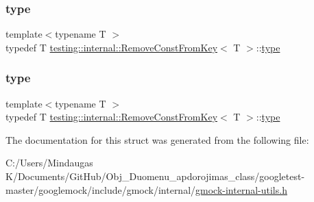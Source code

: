 \mbox{\label{structtesting_1_1internal_1_1_remove_const_from_key_ab657b0a0fe4ebc499d27011f73c794c1}} 
\subsubsection{\texorpdfstring{type}{type}\hspace{0.1cm}{\footnotesize\ttfamily [2/3]}}
{\footnotesize\ttfamily template$<$typename T $>$ \\
typedef T \mbox{\hyperlink{structtesting_1_1internal_1_1_remove_const_from_key}{testing\+::internal\+::\+Remove\+Const\+From\+Key}}$<$ T $>$\+::\mbox{\hyperlink{structtesting_1_1internal_1_1_remove_const_from_key_ab657b0a0fe4ebc499d27011f73c794c1}{type}}}

\mbox{\label{structtesting_1_1internal_1_1_remove_const_from_key_ab657b0a0fe4ebc499d27011f73c794c1}} 
\subsubsection{\texorpdfstring{type}{type}\hspace{0.1cm}{\footnotesize\ttfamily [3/3]}}
{\footnotesize\ttfamily template$<$typename T $>$ \\
typedef T \mbox{\hyperlink{structtesting_1_1internal_1_1_remove_const_from_key}{testing\+::internal\+::\+Remove\+Const\+From\+Key}}$<$ T $>$\+::\mbox{\hyperlink{structtesting_1_1internal_1_1_remove_const_from_key_ab657b0a0fe4ebc499d27011f73c794c1}{type}}}



The documentation for this struct was generated from the following file\+:\begin{DoxyCompactItemize}
\item 
C\+:/\+Users/\+Mindaugas K/\+Documents/\+Git\+Hub/\+Obj\+\_\+\+Duomenu\+\_\+apdorojimas\+\_\+class/googletest-\/master/googlemock/include/gmock/internal/\mbox{\hyperlink{googletest-master_2googlemock_2include_2gmock_2internal_2gmock-internal-utils_8h}{gmock-\/internal-\/utils.\+h}}\end{DoxyCompactItemize}
